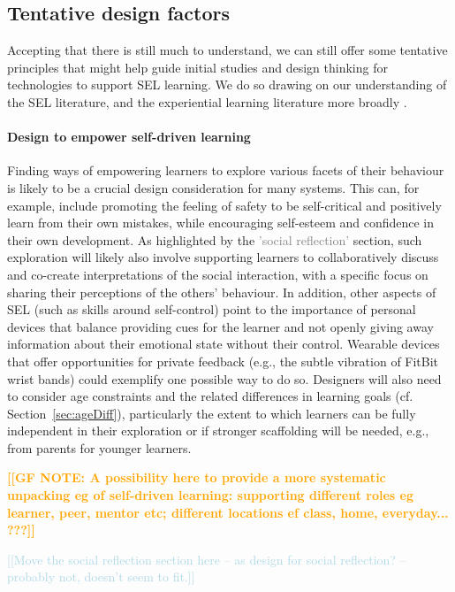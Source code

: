 \documentclass[prodmode,acmtochi]{acmsmall}
\newcommand{\todo}[1]{\textrm{\textrm{\textcolor{LightBlue}{[[#1]]}}}}
\newcommand{\Geraldine}[1]{\textrm{\textbf{\textcolor{Orange}{[[#1]]}}}}
\newcommand{\rephrase}[1]{\textrm{\textrm{\textcolor{gray}{#1}}}}
\begin{document}
\subsection*{Tentative design factors}
Accepting that there is still much to understand, we can still offer some tentative principles that might help guide initial studies and design thinking for technologies to support SEL learning.
We do so drawing on our understanding of the SEL literature, and the experiential learning literature more broadly \cite{Moon1999,Kolb2001,Griffith2000,Fleck2010}. 

\paragraph{Design to empower self-driven learning} Finding ways of empowering learners to explore various facets of their behaviour is likely to be a crucial design consideration for many systems. This can, for example, include promoting the feeling of safety to be self-critical and positively learn from their own mistakes, while encouraging self-esteem and confidence in their own development. As highlighted by  the \rephrase{'social reflection'} section, such exploration will likely also involve supporting learners to collaboratively discuss and co-create interpretations of the social interaction, with a specific focus on sharing their perceptions of the others' behaviour. In addition, other aspects of SEL (such as skills around self-control) point to the importance of personal devices that balance providing cues for the learner and not openly giving away information about their emotional state without their control. Wearable devices that offer opportunities for private feedback (e.g., the subtle vibration of FitBit wrist bands) could exemplify one possible way to do so. Designers will also need to consider age constraints and the related differences in learning goals
(cf. Section~\ref{sec:ageDiff}), particularly the extent to which learners can be fully independent in their exploration or if stronger scaffolding will be needed, e.g., from parents for younger learners. 

\Geraldine{GF NOTE: A possibility here to provide a more systematic unpacking eg of self-driven learning: supporting different roles eg learner, peer, mentor etc; different locations ef class, home, everyday... ???}

\todo{Move the social reflection section here -- as design for social reflection? -- probably not, doesn't seem to fit.}
\end{document}
